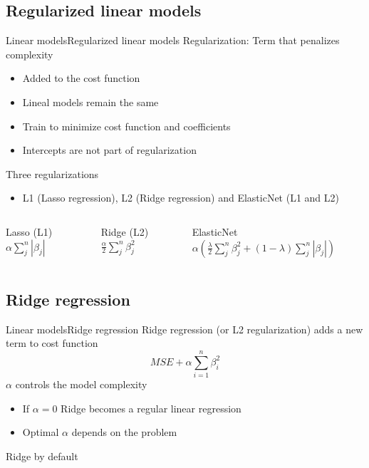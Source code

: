 \documentclass[10pt,compress]{beamer} %
\begin{document}
\subsection{Regularized linear models}
\begin{frame}{Linear models}{Regularized linear models}
	\alert{Regularization}: Term that penalizes complexity
	\begin{itemize}
		\item Added to the cost function
        \item Lineal models remain the same
        \item Train to minimize cost function and coefficients
        \item Intercepts are not part of regularization
	\end{itemize}

    Three regularizations
	\begin{itemize}
		\item L1 (Lasso regression),  L2 (Ridge regression) and ElasticNet (L1 and L2)
	\end{itemize}

    \begin{columns}
    		\begin{block}{Lasso (L1)}
            	$\alpha \sum_j^n |\beta_j|$
        	\end{block}

     		\begin{block}{Ridge (L2)}
            	$\frac{\alpha}{2} \sum_j^n \beta_j^2$
        	\end{block}

     		\begin{block}{ElasticNet}
			$\alpha \left( \frac{\lambda}{2} \sum_j^n \beta_j^2 + (1-\lambda) \sum_j^n |\beta_j| \right)$
        	\end{block}
    \end{columns}
\end{frame}

\subsection{Ridge regression}
\begin{frame}{Linear models}{Ridge regression}
	Ridge regression (or L2 regularization) adds a new term to cost function
    \begin{equation*}
        MSE + \alpha \sum_{i=1}^n \beta_i^2
    \end{equation*}
    $\alpha$ controls the model complexity
	\begin{itemize}
		\item If $\alpha = 0$ Ridge becomes a regular linear regression
        \item Optimal $\alpha$ depends on the problem
	\end{itemize}
    Ridge by default
\end{frame}
\end{document}
